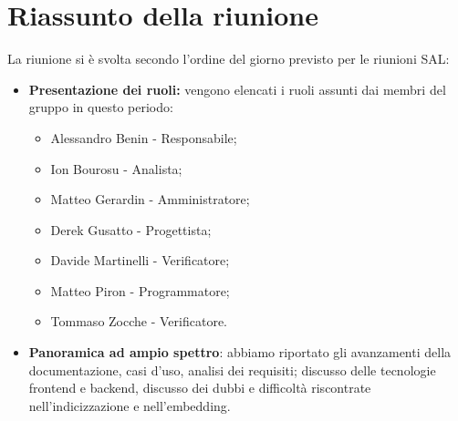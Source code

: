 \section{Riassunto della riunione}
La riunione si è svolta secondo l’ordine del giorno previsto per le riunioni SAL:
\begin{itemize}
    \item \textbf{Presentazione dei ruoli:} 
    vengono elencati i ruoli assunti dai membri del gruppo
in questo periodo:
\begin{itemize}
        \item Alessandro Benin - Responsabile;
        \item Ion Bourosu - Analista;
        \item Matteo Gerardin - Amministratore;
        \item Derek Gusatto - Progettista;
        \item Davide Martinelli - Verificatore;
        \item Matteo Piron - Programmatore;
        \item Tommaso Zocche - Verificatore.
    \end{itemize}
\item \textbf{Panoramica ad ampio spettro}:
abbiamo riportato gli avanzamenti della documentazione, casi d'uso, analisi dei requisiti; discusso delle tecnologie frontend e backend, discusso dei dubbi e difficoltà riscontrate nell'indicizzazione e nell'embedding.


\end{itemize}
